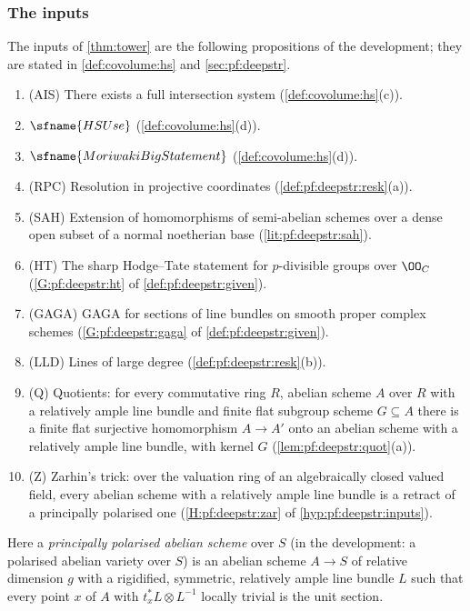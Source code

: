 \subsubsection*{The inputs}
The inputs of \cref{thm:tower} are the following propositions of the development; they are stated in
\cref{def:covolume:hs} and \cref{sec:pf:deepstr}.
\begin{enumerate}[label=(I\arabic*)]
\item\label{I:pf:tower:ais} (AIS) There exists a full intersection system (\cref{def:covolume:hs}(c)).
\item\label{I:pf:tower:hs} $\sfname{HSUse}$ (\cref{def:covolume:hs}(d)).
\item\label{I:pf:tower:mor} $\sfname{MoriwakiBigStatement}$ (\cref{def:covolume:hs}(d)).
\item\label{I:pf:tower:rpc} (RPC) Resolution in projective coordinates (\cref{def:pf:deepstr:resk}(a)).
\item\label{I:pf:tower:sah} (SAH) Extension of homomorphisms of semi-abelian schemes over a dense open
  subset of a normal noetherian base (\cref{lit:pf:deepstr:sah}).
\item\label{I:pf:tower:ht} (HT) The sharp Hodge--Tate statement for $p$-divisible groups over $\OO_C$
  (\ref{G:pf:deepstr:ht} of \cref{def:pf:deepstr:given}).
\item\label{I:pf:tower:gaga} (GAGA) GAGA for sections of line bundles on smooth proper complex schemes
  (\ref{G:pf:deepstr:gaga} of \cref{def:pf:deepstr:given}).
\item\label{I:pf:tower:lld} (LLD) Lines of large degree (\cref{def:pf:deepstr:resk}(b)).
\item\label{I:pf:tower:q} (Q) Quotients: for every commutative ring $R$, abelian scheme $A$ over $R$ with a
  relatively ample line bundle and finite flat subgroup scheme $G\subseteq A$ there is a finite flat
  surjective homomorphism $A\to A'$ onto an abelian scheme with a relatively ample line bundle, with kernel
  $G$ (\cref{lem:pf:deepstr:quot}(a)).
\item\label{I:pf:tower:z} (Z) Zarhin's trick: over the valuation ring of an algebraically closed valued field,
  every abelian scheme with a relatively ample line bundle is a retract of a principally polarised one
  (\ref{H:pf:deepstr:zar} of \cref{hyp:pf:deepstr:inputs}).
\end{enumerate}
Here a \emph{principally polarised abelian scheme} over $S$ (in the development: a polarised abelian
variety over $S$) is an abelian scheme $A\to S$ of relative dimension $g$ with a rigidified, symmetric,
relatively ample line bundle $L$ such that every point $x$ of $A$ with $t_x^*L\otimes L^{-1}$ locally
trivial is the unit section.


